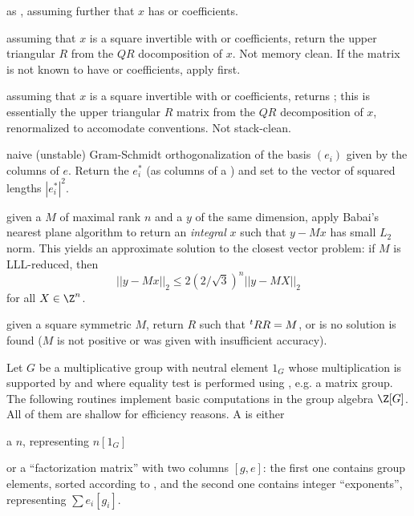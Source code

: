  as
, assuming further that $x$ has  or 
coefficients.

 assuming that $x$ is a square
invertible  with  or  coefficients, return
the upper triangular $R$ from the $QR$ docomposition of $x$. Not memory
clean. If the matrix is not known to have  or 
coefficients, apply  first.

 assuming that $x$ is a square
invertible  with  or  coefficients, returns
; this is essentially the upper triangular $R$
matrix from the $QR$ decomposition of $x$, renormalized to accomodate
 conventions. Not stack-clean.

 naive (unstable) Gram-Schmidt
orthogonalization of the basis $(e_i)$ given by the columns of  $e$.
Return the $e_i^*$ (as columns of a ) and set  to the
vector of squared lengths $|e_i^*|^2$.

 given a  $M$ of maximal rank $n$
and a  $y$ of the same dimension, apply Babai's nearest plane
algorithm to return an \emph{integral} $x$ such that $y - Mx$ has small $L_2$
norm. This yields an approximate solution to the closest vector problem: if
$M$ is LLL-reduced, then
$$|| y - Mx ||_2 \leq 2 (2/\sqrt{3})^n || y - MX ||_2$$
for all $X \in \Z^n$.

 given a square symmetric  $M$, return
$R$ such that $^t{}R\*R = M$, or  is no solution is found ($M$ is
not positive or was given with insufficient accuracy).


Let $G$ be a multiplicative group with neutral element $1_G$ whose
multiplication is supported by  and where equality test is
performed using , e.g. a matrix group. The following
routines implement basic computations in the group algebra $\Z[G]$. All of
them are shallow for efficiency reasons. A  is either

\item a  $n$, representing $n[1_G]$

\item or a ``factorization matrix'' with two columns $[g,e]$: the first one
contains group elements, sorted according to , and the
second one contains integer ``exponents'', representing $\sum e_i [g_i]$.


